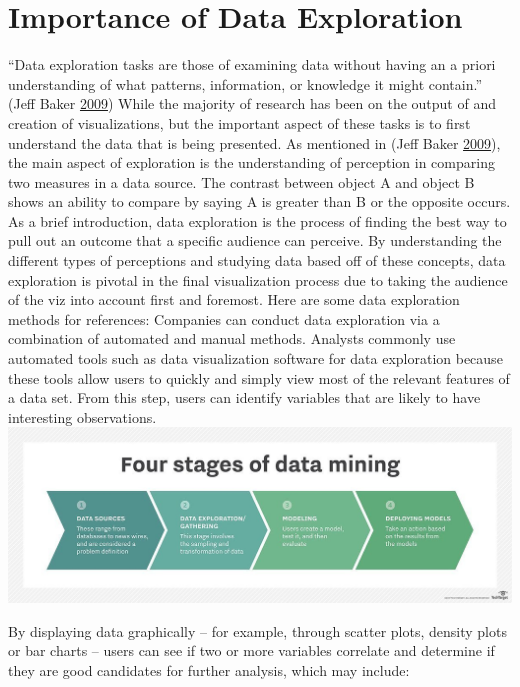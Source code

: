 \documentclass[]{book}
\begin{document}
\hypertarget{importance-of-data-exploration}{%
\section{Importance of Data Exploration}\label{importance-of-data-exploration}}

``Data exploration tasks are those of examining data without having an a priori understanding of what patterns, information, or knowledge it might contain.'' (Jeff Baker \protect\hyperlink{ref-Data_Exploration_1}{2009}) While the majority of research has been on the output of and creation of visualizations, but the important aspect of these tasks is to first understand the data that is being presented. As mentioned in (Jeff Baker \protect\hyperlink{ref-Data_Exploration_1}{2009}), the main aspect of exploration is the understanding of perception in comparing two measures in a data source. The contrast between object A and object B shows an ability to compare by saying A is greater than B or the opposite occurs. As a brief introduction, data exploration is the process of finding the best way to pull out an outcome that a specific audience can perceive. By understanding the different types of perceptions and studying data based off of these concepts, data exploration is pivotal in the final visualization process due to taking the audience of the viz into account first and foremost.
Here are some data exploration methods for references:
Companies can conduct data exploration via a combination of automated and manual methods.
Analysts commonly use automated tools such as data visualization software for data exploration because these tools allow users to quickly and simply view most of the relevant features of a data set. From this step, users can identify variables that are likely to have interesting observations.
\includegraphics{images/Data_exploration.jpg}

By displaying data graphically -- for example, through scatter plots, density plots or bar charts -- users can see if two or more variables correlate and determine if they are good candidates for further analysis, which may include:
\end{document}
